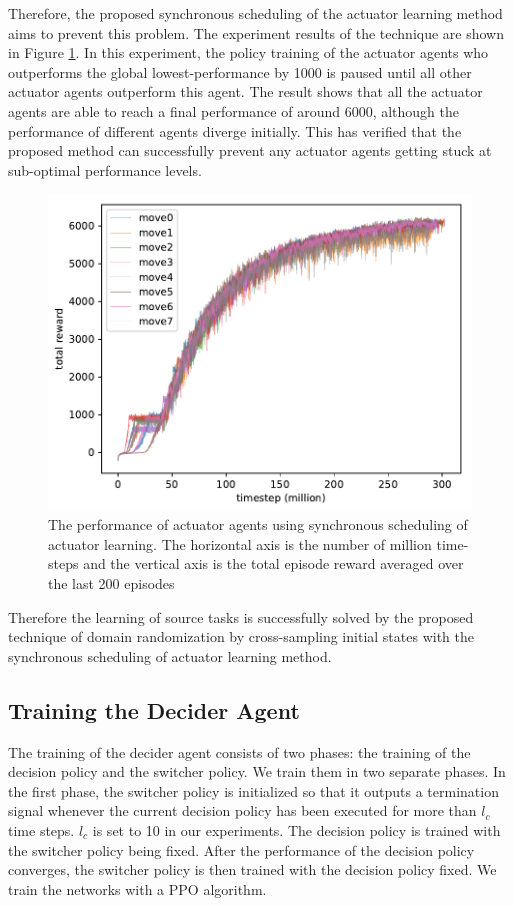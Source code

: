 Therefore, the proposed synchronous scheduling of the actuator learning method aims to prevent this problem. The experiment results of the technique are shown in Figure \ref{rec_sync_training}. In this experiment, the policy training of the actuator agents who outperforms the global lowest-performance by 1000 is paused until all other actuator agents outperform this agent. The result shows that all the actuator agents are able to reach a final performance of around 6000, although the performance of different agents diverge initially. This has verified that the proposed method can successfully prevent any actuator agents getting stuck at sub-optimal performance levels. 

\begin{figure}[!htbp]
	\includegraphics[width=\textwidth]{images/rec_180619_sync.pdf}
	\centering
	\caption{The performance of actuator agents using synchronous scheduling of actuator learning. The horizontal axis is the number of million time-steps and the vertical axis is the total episode reward averaged over the last 200 episodes}\label{rec_sync_training}
\end{figure}

Therefore the learning of source tasks is successfully solved by the proposed technique of domain randomization by cross-sampling initial states with the synchronous scheduling of actuator learning method.
\subsection{Training the Decider Agent}
The training of the decider agent consists of two phases: the training of the decision policy and the switcher policy. We train them in two separate phases. In the first phase, the switcher policy is initialized so that it outputs a termination signal whenever the current decision policy has been executed for more than $l_c$ time steps. $l_c$  is set to 10 in our experiments. The decision policy is trained with the switcher policy being fixed. After the performance of the decision policy converges, the switcher policy is then trained with the decision policy fixed. We train the networks with a PPO algorithm.

